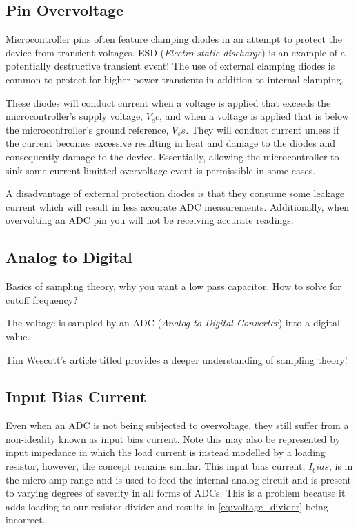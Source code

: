 \documentclass[main.tex]{subfiles}
\begin{document}
\subsection{Pin Overvoltage}
Microcontroller pins often feature clamping diodes in an attempt to protect the device from transient voltages. ESD (\textit{Electro-static discharge}) is an example of a potentially destructive transient event! The use of external clamping diodes is common to protect for higher power transients in addition to internal clamping. 


These diodes will conduct current when a voltage is applied that exceeds the microcontroller's supply voltage, $V_cc$, and when a voltage is applied that is below the microcontroller's ground reference, $V_ss$. They will conduct current unless if the current becomes excessive resulting in heat and damage to the diodes and consequently damage to the device. Essentially, allowing the microcontroller to sink some current limitted overvoltage event is permissible in some cases. 

A disadvantage of external protection diodes is that they consume some leakage current which will result in less accurate ADC measurements. Additionally, when overvolting an ADC pin you will not be receiving accurate readings.

\subsection{Analog to Digital}

Basics of sampling theory, why you want a low pass capacitor. How to solve for cutoff frequency? 

The voltage is sampled by an ADC (\textit{Analog to Digital Converter}) into a digital value. 

Tim Wescott's article titled  provides a deeper understanding of sampling theory! 

\subsection{Input Bias Current}
Even when an ADC is not being subjected to overvoltage, they still suffer from a non-ideality known as input bias current. Note this may also be represented by input impedance in which the load current is instead modelled by a loading resistor, however, the concept remains similar. This input bias current, $I_bias$, is in the micro-amp range and is used to feed the internal analog circuit and is present to varying degrees of severity in all forms of ADCs. This is a problem because it adds loading to our resistor divider and results in \eqref{eq:voltage_divider} being incorrect. 
\end{document}

